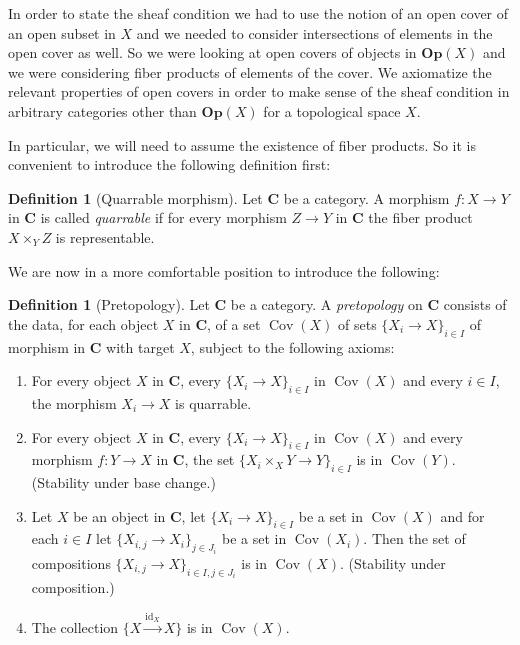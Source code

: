 \documentclass[12pt,a4paper]{amsart}
\theoremstyle{plain}
\theoremstyle{definition}
\newtheorem{defn}[thm]{Definition}
\theoremstyle{remark}
\begin{document}
In order to state the sheaf condition we had to use the notion of an open cover of an open subset in $X$ and we needed to consider intersections of elements in the open cover as well.
So we were looking at open covers of objects in $\mathbf{Op}(X)$ and we were considering fiber products of elements of the cover.
We axiomatize the relevant properties of open covers in order to make sense of the sheaf condition in arbitrary categories other than $\mathbf{Op}(X)$ for a topological space $X$.

In particular, we will need to assume the existence of fiber products.
So it is convenient to introduce the following definition first:

\begin{defn}[Quarrable morphism]
  Let $\mathbf{C}$ be a category.
  A morphism $f \colon X \to Y$ in $\mathbf{C}$ is called \textit{quarrable} if for every morphism $Z \to Y$ in $\mathbf{C}$ the fiber product $X \times_{Y} Z$ is representable.
\end{defn}

We are now in a more comfortable position to introduce the following:

\begin{defn}[Pretopology]
  Let $\mathbf{C}$ be a category.
  A \textit{pretopology} on $\mathbf{C}$ consists of the data, for each object $X$ in $\mathbf{C}$, of a set $\operatorname{Cov}(X)$ of sets $\{ X_{i} \to X \}_{i \in I}$ of morphism in $\mathbf{C}$ with target $X$, subject to the following axioms:
  \begin{enumerate}[label=PT \arabic*)]\addtocounter{enumi}{-1}
    \item For every object $X$ in $\mathbf{C}$, every $\{ X_{i} \to X \}_{i \in I}$ in $\operatorname{Cov}(X)$ and every $i \in I$, the morphism $X_{i} \to X$ is quarrable.\label{pt:0}
    \item For every object $X$ in $\mathbf{C}$, every $\{ X_{i} \to X \}_{i \in I}$ in $\operatorname{Cov}(X)$ and every morphism $f \colon Y \to X$ in $\mathbf{C}$, the set $\{ X_{i} \times_{X} Y \to Y \}_{i \in I}$ is in $\operatorname{Cov}(Y)$.
      (Stability under base change.)\label{pt:1}
    \item Let $X$ be an object in $\mathbf{C}$, let $\{ X_{i} \to X \}_{i \in I}$ be a set in $\operatorname{Cov}(X)$ and for each $i \in I$ let $\{ X_{i,j} \to X_{i}\}_{j \in J_{i}}$ be a set in $\operatorname{Cov}(X_{i})$.
      Then the set of compositions $\{ X_{i,j} \to X \}_{i \in I, j \in J_{i}}$ is in $\operatorname{Cov}(X)$.
      (Stability under composition.)\label{pt:2}
    \item The collection $\{ X \xrightarrow{\operatorname{id}_{X}} X \}$ is in $\operatorname{Cov}(X)$.\label{pt:3}
  \end{enumerate}
\end{defn}
\end{document}
